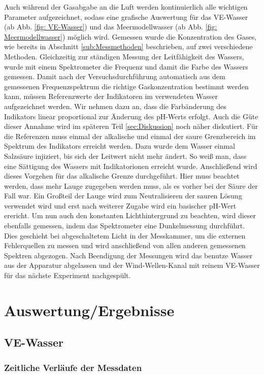 \documentclass[12pt]{article}
\begin{document}
Auch während der Gasabgabe an die Luft werden kontinuierlich alle wichtigen Parameter aufgezeichnet, sodass eine grafische Auswertung für das VE-Wasser (ab Abb. \ref{fig: VE-Wasser}) und das Meermodellwasser (ab Abb. \ref{fig: Meermodellwasser}) möglich wird. 
Gemessen wurde die Konzentration des Gases, wie bereits in Abschnitt \ref{sub:Messmethoden} beschrieben, auf zwei verschiedene Methoden. Gleichzeitig zur ständigen Messung der Leitfähigkeit des Wassers, wurde mit einem Spektrometer die Frequenz und damit die Farbe des Wassers gemessen. 
Damit nach der Versuchsdurchführung automatisch aus dem gemessenen Frequenzspektrum die richtige Gaskonzentration bestimmt werden kann, müssen Referenzwerte der Indikatoren im verwendeten Wasser aufgezeichnet werden. Wir nehmen dazu an, dass die Farbänderung des Indikators linear proportional zur Änderung des pH-Werts erfolgt. Auch die Güte dieser Annahme wird im späteren Teil \ref{sec:Diskussion} noch näher diskutiert. 
Für die Referenzen muss einmal der alkalische und einmal der saure Grenzbereich im Spektrum des Indikators erreicht werden. Dazu wurde dem Wasser einmal Salzsäure injiziert, bis sich der Leitwert nicht mehr ändert. So weiß man, dass eine Sättigung des Wassers mit Indikatorionen erreicht wurde. Anschließend wird dieses Vorgehen für das alkalische Grenze durchgeführt. Hier muss beachtet werden, dass mehr Lauge zugegeben werden muss, als es vorher bei der Säure der Fall war. Ein Großteil der Lauge wird zum Neutralisieren der sauren Lösung verwendet wird und erst nach weiterer Zugabe wird ein basischer pH-Wert erericht. Um nun auch den konstanten Lichthintergrund zu beachten, wird dieser ebenfalls gemessen, indem das Spektrometer eine Dunkelmessung durchführt. Dies geschieht bei abgeschaltetem Licht in der Messkammer, um die externen Fehlerquellen zu messen und wird anschließend von allen anderen gemessenen Spektren abgezogen. 
Nach Beendigung der Messungen wird das benutze Wasser aus der Apparatur abgelassen und der Wind-Wellen-Kanal mit reinem VE-Wasser für das nächste Experiment nachgespült.



\section{Auswertung/Ergebnisse}
\subsection{VE-Wasser}
\subsubsection{Zeitliche Verläufe der Messdaten}
\end{document}
